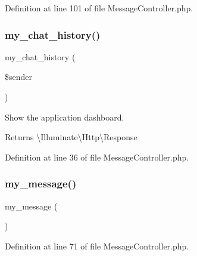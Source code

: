 Definition at line 101 of file Message\+Controller.\+php.

\mbox{\label{class_responsive_1_1_http_1_1_controllers_1_1_message_controller_aa80e8692e0695df05cc641753a22efc1}} 
\subsubsection{\texorpdfstring{my\_chat\_history()}{my\_chat\_history()}}
{\footnotesize\ttfamily my\+\_\+chat\+\_\+history (\begin{DoxyParamCaption}\item[{}]{\$sender }\end{DoxyParamCaption})}

Show the application dashboard.

\begin{DoxyReturn}{Returns}
\textbackslash{}\+Illuminate\textbackslash{}\+Http\textbackslash{}\+Response 
\end{DoxyReturn}


Definition at line 36 of file Message\+Controller.\+php.

\mbox{\label{class_responsive_1_1_http_1_1_controllers_1_1_message_controller_a1ece6e5f0aaed8104e4a2c13c8b64d98}} 
\subsubsection{\texorpdfstring{my\_message()}{my\_message()}}
{\footnotesize\ttfamily my\+\_\+message (\begin{DoxyParamCaption}{ }\end{DoxyParamCaption})}



Definition at line 71 of file Message\+Controller.\+php.

\mbox{\label{class_responsive_1_1_http_1_1_controllers_1_1_message_controller_a8ebe89fe9c868492f4eb8322c789bc64}} 

